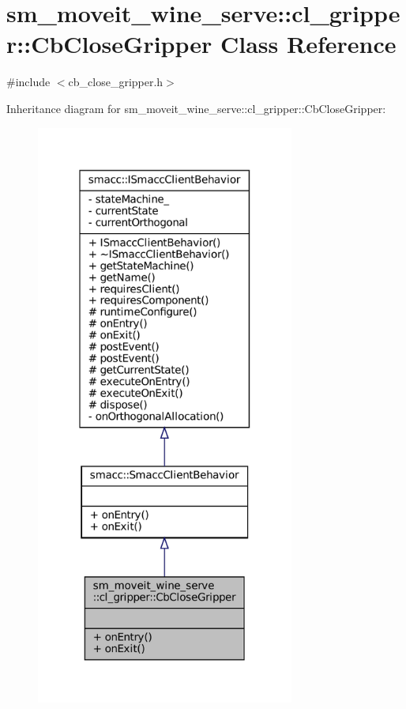 \hypertarget{classsm__moveit__wine__serve_1_1cl__gripper_1_1CbCloseGripper}{}\section{sm\+\_\+moveit\+\_\+wine\+\_\+serve\+:\+:cl\+\_\+gripper\+:\+:Cb\+Close\+Gripper Class Reference}
\label{classsm__moveit__wine__serve_1_1cl__gripper_1_1CbCloseGripper}


{\ttfamily \#include $<$cb\+\_\+close\+\_\+gripper.\+h$>$}



Inheritance diagram for sm\+\_\+moveit\+\_\+wine\+\_\+serve\+:\+:cl\+\_\+gripper\+:\+:Cb\+Close\+Gripper\+:
\nopagebreak
\begin{figure}[H]
\begin{center}
\leavevmode
\includegraphics[width=241pt]{classsm__moveit__wine__serve_1_1cl__gripper_1_1CbCloseGripper__inherit__graph}
\end{center}
\end{figure}


